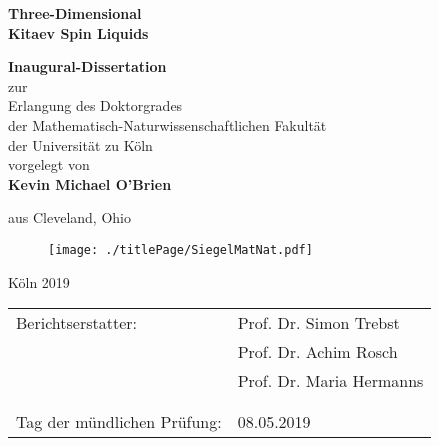 \begin{titlepage}

	\vspace*{\fill}
	\begin{center}
		
		{\Huge\textbf{Three-Dimensional\\
				\vspace{0.5cm}
				Kitaev Spin Liquids}}\\
		\vspace{1.5cm}
	
		\doublespacing
		\textbf{Inaugural-Dissertation}\\
		zur\\
		Erlangung des Doktorgrades\\
		der Mathematisch-Naturwissenschaftlichen Fakult\"{a}t\\
		der Universit\"{a}t zu K\"{o}ln\\
		vorgelegt von\\
		
		\vspace{0.5cm}
		{\Large\textbf{Kevin Michael O'Brien}}\\
		\vspace{0.5cm}

		\normalsize
		aus Cleveland, Ohio\\

		\vspace{1.cm}		
		\begin{figure}[h!]
			\centering
			\texttt{[image: ./titlePage/SiegelMatNat.pdf]}
		\end{figure}
		\vspace{1.0cm}
				
		K\"{o}ln 2019
	\end{center}
	\vspace*{\fill}

\end{titlepage}

\onehalfspacing


\noindent
\begin{tabular}{ll}
	Berichtserstatter: \hspace{2cm} & Prof. Dr. Simon Trebst \\
		   & Prof. Dr. Achim Rosch\\
		   & Prof. Dr. Maria Hermanns\\
		   & \\
		   & \\
	Tag der m\"{u}ndlichen Pr\"{u}fung: & 08.05.2019
\end{tabular}